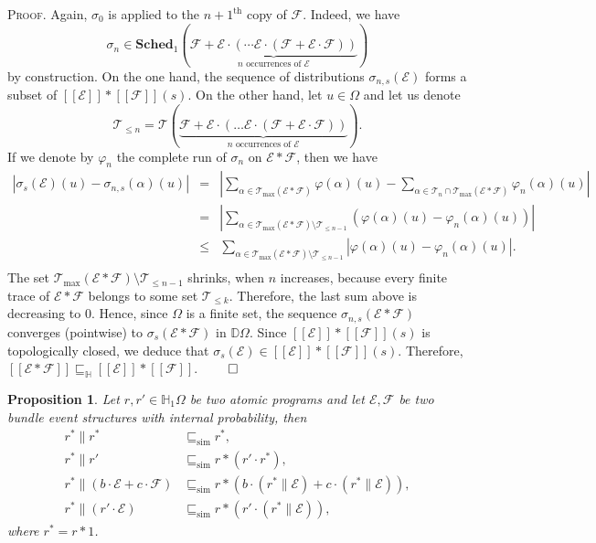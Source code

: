 \documentclass[review]{elsart}
\newtheorem{proposition}[definition]{Proposition}
\newenvironment{proof}{\par
\noindent
\textsc{Proof. }
\noindent}{\hfill\(\qed\)}
\newcommand{\D}{\mathbb{D}}
\renewcommand{\H}{\mathbb{H}}
\newcommand{\EE}{\mathcal{E}}
\newcommand{\FF}{\mathcal{F}}
\newcommand{\TT}{\mathcal{T}}
\newcommand{\sched}{\mathbf{Sched}}
\newcommand{\sem}[1]{[\![#1]\!]}
\newcommand{\bks}{*}
\newcommand{\refby}{\sqsubseteq}
\newcommand{\refbyh}{\sqsubseteq_{\mathbb{H}}}
\newcommand{\simref}{\refby_{\mathrm{sim}}}
\begin{document}
\begin{proof}
Again, $\sigma_0$ is applied to the $n{+}1^{\textrm{th}}$ copy of $\FF$. Indeed, we have 
\[
	\sigma_n{\in}\sched_1(\underbrace{\FF {+} \EE{\cdot}(\cdots\EE{\cdot}(\FF {+} \EE{\cdot}\FF))}_{n\textrm{ occurrences of } \EE})
\] 
by construction. On the one hand, the sequence of distributions $\sigma_{n,s}(\EE)$ forms a subset of $\sem{\EE}{\bks}\sem{\FF}(s)$. On the other hand, let $u{\in}\Omega$ and let us denote 
\[
	\TT_{\leq n} = \TT(\underbrace{\FF {+} \EE{\cdot}(\dots \EE{\cdot}(\FF {+} \EE{\cdot}\FF))}_{n \textrm{ occurrences of }\EE}).
\]	
If we denote by $\varphi_n$ the complete run of $\sigma_n$ on $\EE{\bks}\FF$, then we have
\begin{eqnarray*}
\left|\sigma_s(\EE)(u) - \sigma_{n,s}(\alpha)(u)\right| & = & \left|\sum_{\alpha{\in}\TT_{\max}(\EE{\bks}\FF)}\varphi(\alpha)(u){-}\sum_{\alpha{\in}\TT_n{\cap}\TT_{\max}(\EE{\bks}\FF)}\varphi_n(\alpha)(u)\right|\\
& = & \left|\sum_{\alpha{\in}\TT_{\max}(\EE{\bks}\FF){\setminus}\TT_{\leq n{-}1}}\left(\varphi(\alpha)(u) {-} \varphi_n(\alpha)(u)\right)\right|\\
&\leq& \sum_{\alpha{\in}\TT_{\max}(\EE{\bks}\FF){\setminus}\TT_{\leq n{-}1}}\left|\varphi(\alpha)(u) {-} \varphi_n(\alpha)(u)\right|.\\
\end{eqnarray*}
The set $\TT_{\max}(\EE{\bks}\FF){\setminus}\TT_{\leq n{-}1}$ shrinks, when $n$ increases, because every finite trace of $\EE{\bks}\FF$ belongs to some set $\TT_{\leq k}$. Therefore, the last sum above is decreasing to $0$. Hence, since $\Omega$ is a finite set, the sequence $\sigma_{n,s}(\EE{\bks}\FF)$ converges (pointwise) to $\sigma_s(\EE{\bks}\FF)$ in $\D\Omega$. Since $\sem{\EE}{\bks}\sem{\FF}(s)$ is topologically closed, we deduce that $\sigma_s(\EE){\in}\sem{\EE}{\bks}\sem{\FF}(s)$. Therefore, $\sem{\EE{\bks}\FF}\refbyh\sem{\EE}{\bks}\sem{\FF}$.
\end{proof}

\begin{proposition}\label{pro:get-rid-of-par}
Let $r,r'{\in}\H_1\Omega$ be two atomic programs and let $\EE,\FF$ be two bundle event structures with internal probability, then 
\begin{align}
r^{\bks}\|r^{\bks}&\simref r^{\bks},\label{eq:star-trans}\\
r^{\bks}\|r'&\simref r{\bks}(r'{\cdot} r^{\bks}),\label{eq:par-atom}\\
r^{\bks}\|(b{\cdot} \EE {+} c{\cdot}\FF)& \simref  r{\bks}(b{\cdot} (r^{\bks}\|\EE)
{+}c{\cdot} (r^{\bks}\|\EE)),\label{eq:par-nondet}\\
r^{\bks}\|(r'{\cdot}\EE)&\simref r{\bks}(r'{\cdot} (r^{\bks}\|\EE)), \label{eq:par-seq}
\end{align}
where $r^{\bks} = r{\bks} 1$.
\end{proposition}
\end{document}

